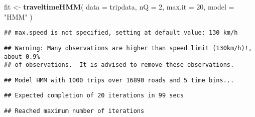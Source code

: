 \documentclass[
]{article}
\newenvironment{Shaded}{\begin{snugshade}}{\end{snugshade}}
\newcommand{\AttributeTok}[1]{\textcolor[rgb]{0.13,0.29,0.53}{#1}}
\newcommand{\ConstantTok}[1]{\textcolor[rgb]{0.56,0.35,0.01}{#1}}
\newcommand{\DecValTok}[1]{\textcolor[rgb]{0.00,0.00,0.81}{#1}}
\newcommand{\FunctionTok}[1]{\textcolor[rgb]{0.13,0.29,0.53}{\textbf{#1}}}
\newcommand{\NormalTok}[1]{#1}
\newcommand{\OtherTok}[1]{\textcolor[rgb]{0.56,0.35,0.01}{#1}}
\newcommand{\SpecialCharTok}[1]{\textcolor[rgb]{0.81,0.36,0.00}{\textbf{#1}}}
\newcommand{\StringTok}[1]{\textcolor[rgb]{0.31,0.60,0.02}{#1}}
\begin{document}
\begin{Shaded}
\begin{Highlighting}[]
\NormalTok{fit }\OtherTok{\textless{}{-}} \FunctionTok{traveltimeHMM}\NormalTok{(}
  \AttributeTok{data =}\NormalTok{ tripdata,}
  \AttributeTok{nQ =} \DecValTok{2}\NormalTok{, }\AttributeTok{max.it =} \DecValTok{20}\NormalTok{, }\AttributeTok{model =} \StringTok{"HMM"}
\NormalTok{)}
\end{Highlighting}
\end{Shaded}

\begin{verbatim}
## max.speed is not specified, setting at default value: 130 km/h
\end{verbatim}

\begin{verbatim}
## Warning: Many observations are higher than speed limit (130km/h)!, about 0.9%
## of observations.  It is advised to remove these observations.
\end{verbatim}

\begin{verbatim}
## Model HMM with 1000 trips over 16890 roads and 5 time bins...
\end{verbatim}

\begin{verbatim}
## Expected completion of 20 iterations in 99 secs
\end{verbatim}

\begin{verbatim}
## Reached maximum number of iterations
\end{verbatim}

\begin{Shaded}
\end{Shaded}

\begin{Shaded}
\end{Shaded}
\end{document}
